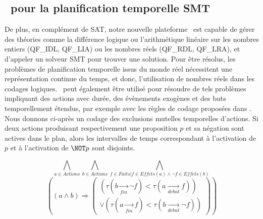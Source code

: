 \subsection{\nameTool\ pour la planification temporelle SMT}

De plus, en compl\'ement de SAT, notre nouvelle plateforme \nameTool\ est capable de g\'erer des th\'eories comme la diff\'erence logique ou l'arithm\'etique lin\'eaire sur les nombres entiers (QF\_IDL, QF\_LIA) ou les nombres r\'eels (QF\_RDL, QF\_LRA), et d'appeler un solveur SMT pour trouver une solution. Pour \^etre r\'esolus, les probl\`emes de planification temporelle issus du monde r\'eel n\'ecessitent une repr\'esentation continue du temps, et donc, l'utilisation de nombres r\'eels dans les codages logiques. \nameTool\ peut \'egalement \^etre utilis\'e pour r\'esoudre de tels probl\`emes impliquant des actions avec dur\'ee, des \'ev\`enements exog\`enes et des buts temporellement \'etendus, par exemple avec les r\`egles de codage propos\'ees dans \cite{MarisRegnier08}. Nous donnons ci-apr\`es un codage des exclusions mutelles temporelles d'actions. Si deux actions produisant respectivement une proposition $p$ et sa n\'egation sont actives dans le plan, alors les intervalles de temps correspondant \`a l'activation de $p$ et \`a l'activation de $\NOT p$ sont disjoints.

  \[\bigwedge_{a\in Actions}
  \bigwedge_{b\in Actions}
  \bigwedge_{f\in Faits | f\in Effets(a) \wedge \lnot f\in Effets(b)}\]
  \[\left(\left(a \wedge b\right) \Rightarrow 
  \left( \begin{aligned} \left(\tau(b \underset{fin}{\rightarrow} \lnot f) < \tau(a \underset{debut}{\rightarrow} f)\right)
    \\ \vee
    \left(\tau(a \underset{fin}{\rightarrow} f) < \tau(b \underset{debut}{\rightarrow} \lnot f)\right)
 \end{aligned} \right)\right) \]




